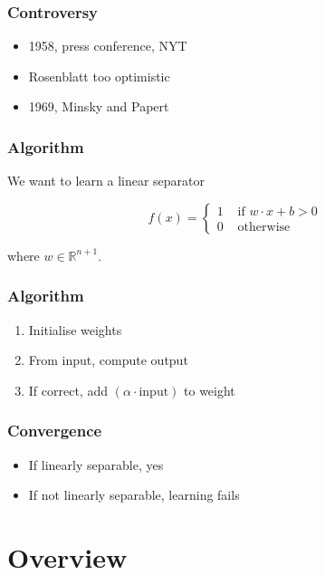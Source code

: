 \begin{frame}
  \frametitle{Controversy}
  \begin{itemize}
  \item 1958, press conference, NYT
  \item Rosenblatt too optimistic
  \item 1969, Minsky and Papert
  \end{itemize}
\end{frame}

\begin{frame}
  \frametitle{Algorithm}

  \hspace{27mm}We want to learn a linear separator
  
  \begin{displaymath}
    f(x) = \left\{
    \begin{array}{ll}
      1 & \text{ if } w\cdot x + b > 0 \\[2mm]
      0 & \text{ otherwise}
    \end{array}\right.
  \end{displaymath}
  
  \hspace{27mm}where $w\in \mathbb{R}^{n+1}$.
\end{frame}

\begin{frame}
  \frametitle{Algorithm}
  \begin{enumerate}
  \item Initialise weights
  \item From input, compute output
  \item If correct, add $(\alpha \cdot\text{input})$ to weight
  \end{enumerate}
\end{frame}

\begin{frame}
  \frametitle{Convergence}
  \begin{itemize}
  \item If linearly separable, yes
  \item If not linearly separable, learning fails
  \end{itemize}
\end{frame}

\begin{frame}
\end{frame}

\section{Overview}

